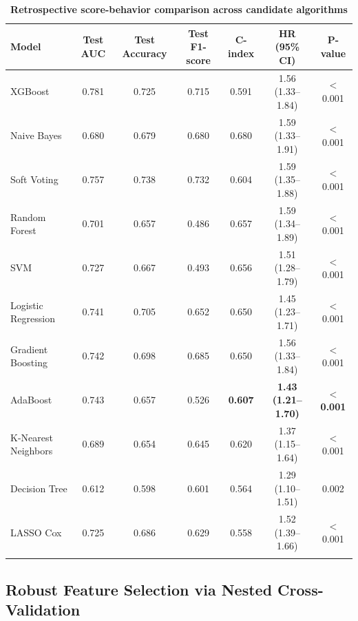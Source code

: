 \documentclass[pdflatex,sn-mathphys-num,referee,lineno]{sn-jnl}
\theoremstyle{thmstyleone}%
\theoremstyle{thmstyletwo}%
\theoremstyle{thmstylethree}%
\begin{document}
\begin{table}
    \caption{\textbf{Retrospective score-behavior comparison across candidate algorithms}}\label{tab:model_performance}
    \begin{tabular*}{\textwidth}{@{\extracolsep\fill}lcccccc}
        \toprule
        \textbf{Model} & \textbf{Test AUC} & \textbf{Test Accuracy} & \textbf{Test F1-score} & \textbf{C-index} & \textbf{HR (95\% CI)} & \textbf{P-value} \\
        \midrule
        XGBoost & 0.781 & 0.725 & 0.715 & 0.591 & 1.56 (1.33--1.84) & $<$0.001 \\
        Naive Bayes & 0.680 & 0.679 & 0.680 & 0.680 & 1.59 (1.33--1.91) & $<$0.001 \\
        Soft Voting & 0.757 & 0.738 & 0.732 & 0.604 & 1.59 (1.35--1.88) & $<$0.001 \\
        Random Forest & 0.701 & 0.657 & 0.486 & 0.657 & 1.59 (1.34--1.89) & $<$0.001 \\
        SVM & 0.727 & 0.667 & 0.493 & 0.656 & 1.51 (1.28--1.79) & $<$0.001 \\
        Logistic Regression & 0.741 & 0.705 & 0.652 & 0.650 & 1.45 (1.23--1.71) & $<$0.001 \\
        Gradient Boosting & 0.742 & 0.698 & 0.685 & 0.650 & 1.56 (1.33--1.84) & $<$0.001 \\
        AdaBoost & 0.743 & 0.657 & 0.526 & \textbf{0.607} & \textbf{1.43 (1.21--1.70)} & \textbf{$<$0.001} \\
        K-Nearest Neighbors & 0.689 & 0.654 & 0.645 & 0.620 & 1.37 (1.15--1.64) & $<$0.001 \\
        Decision Tree & 0.612 & 0.598 & 0.601 & 0.564 & 1.29 (1.10--1.51) & 0.002 \\
        LASSO Cox & 0.725 & 0.686 & 0.629 & 0.558 & 1.52 (1.39--1.66) & $<$0.001 \\
        \botrule
    \end{tabular*}
\end{table}

\subsection{Robust Feature Selection via Nested Cross-Validation}\label{subsec:res_nested_cv}
\end{document}

